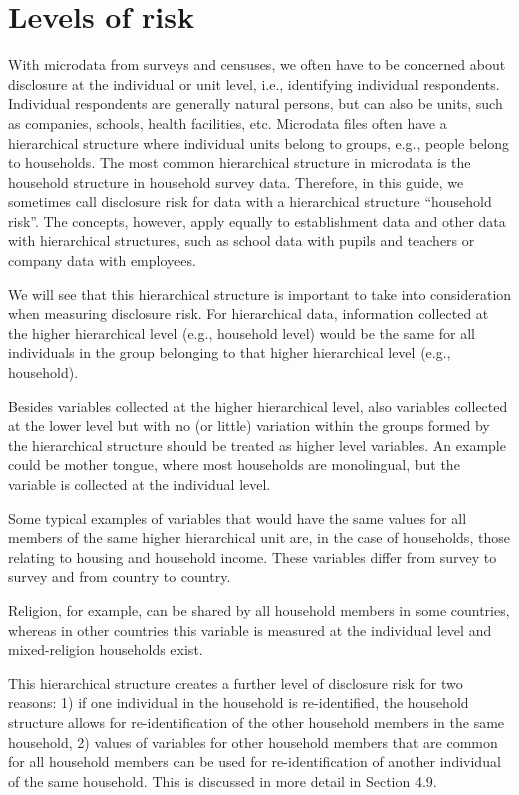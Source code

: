 \documentclass[letterpaper,10pt,english]{sphinxmanual}
\begin{document}
\section{Levels of risk}
\label{\detokenize{measure_risk:levels-of-risk}}
With microdata from surveys and censuses, we often have to be concerned
about disclosure at the individual or unit level, i.e., identifying
individual respondents. Individual respondents are generally natural
persons, but can also be units, such as companies, schools, health
facilities, etc. Microdata files often have a hierarchical structure
where individual units belong to groups, e.g., people belong to
households. The most common hierarchical structure in microdata is the
household structure in household survey data. Therefore, in this guide,
we sometimes call disclosure risk for data with a hierarchical structure
“household risk”. The concepts, however, apply equally to establishment
data and other data with hierarchical structures, such as school data
with pupils and teachers or company data with employees.

We will see that this hierarchical structure is important to take into
consideration when measuring disclosure risk. For hierarchical data,
information collected at the higher hierarchical level (e.g., household
level) would be the same for all individuals in the group belonging to
that higher hierarchical level (e.g., household). %
\begin{footnote}[3]\sphinxAtStartFootnote
Besides variables collected at the higher hierarchical level, also
variables collected at the lower level but with no (or little)
variation within the groups formed by the hierarchical structure
should be treated as higher level variables. An example could be
mother tongue, where most households are monolingual, but the
variable is collected at the individual level.
%
\end{footnote}
Some typical examples of variables that would have the same values for
all members of the same higher hierarchical unit are, in the case of
households, those relating to housing and household income. These
variables differ from survey to survey and from country to
country. %
\begin{footnote}[4]\sphinxAtStartFootnote
Religion, for example, can be shared by all household members in
some countries, whereas in other countries this variable is measured
at the individual level and mixed-religion households exist.
%
\end{footnote} This hierarchical structure creates a
further level of disclosure risk for two reasons: 1) if one individual
in the household is re-identified, the household structure allows for
re-identification of the other household members in the same household,
2) values of variables for other household members that are common for
all household members can be used for re-identification of another
individual of the same household. This is discussed in more detail in
Section 4.9.
\end{document}
